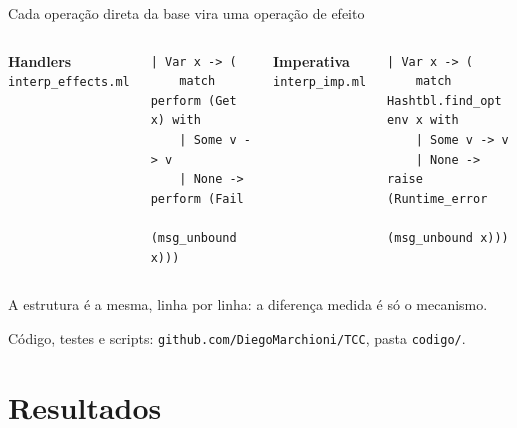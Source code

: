 \documentclass[aspectratio=169,10pt]{beamer}
\newcommand{\oc}[1]{\textcolor{ocamlc}{#1}}
\begin{document}
\begin{frame}[fragile]{Cada operação direta da base vira uma operação de efeito}
  \begin{columns}[T]
    \oc{\textbf{Handlers}} \textperiodcentered{} \texttt{interp\_effects.ml}
\begin{lstlisting}[language=OCamlTCC]
| Var x -> (
    match perform (Get x) with
    | Some v -> v
    | None -> perform (Fail
        (msg_unbound x)))
\end{lstlisting}
    \textcolor{neutral}{\textbf{Imperativa}} \textperiodcentered{} \texttt{interp\_imp.ml}
\begin{lstlisting}[language=OCamlTCC]
| Var x -> (
    match Hashtbl.find_opt env x with
    | Some v -> v
    | None -> raise (Runtime_error
        (msg_unbound x)))
\end{lstlisting}
  \end{columns}
  \vspace{8pt}
  A estrutura é a mesma, linha por linha: a diferença medida é só o mecanismo.

  \vfill
  {\small\color{neutral} Código, testes e scripts: \texttt{github.com/DiegoMarchioni/TCC}, pasta \texttt{codigo/}.}
\end{frame}

\section{Resultados}
\end{document}
